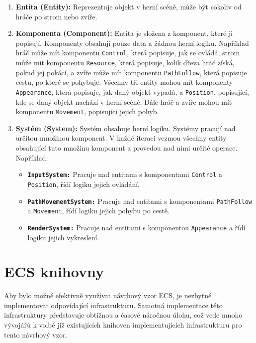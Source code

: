 \begin{enumerate}
    \item \textbf{Entita (Entity):} Reprezentuje objekt v herní scéně, může být cokoliv od hráče po strom nebo zvíře.
    \item \textbf{Komponenta (Component):} Entita je složena z komponent, které ji popisují. Komponenty obsahují pouze data a žádnou herní logiku. Například hráč může mít komponentu \verb|Control|, která popisuje, jak se ovládá, strom může mít komponentu \verb|Resource|, která popisuje, kolik dřeva hráč získá, pokud jej pokácí, a zvíře může mít komponentu \verb|PathFollow|, která popisuje cestu, po které se pohybuje. Všechny tři entity mohou mít komponenty \verb|Appearance|, která popisuje, jak daný objekt vypadá, a \verb|Position|, popisující, kde se daný objekt nachází v herní scéně. Dále hráč a zvíře mohou mít komponentu \verb|Movement|, popisující jejich pohyb.
    \item \textbf{Systém (System):} Systém obsahuje herní logiku. Systémy pracují nad určitou množinou komponent. V každé iteraci vezmou všechny entity obsahující tuto množinu komponent a provedou nad nimi určité operace. Například:
    \begin{itemize}
        \item \textbf{\texttt{InputSystem:}} Pracuje nad entitami s komponentami \verb|Control| a \verb|Position|, řídí logiku jejich ovládání.
        \item \textbf{\texttt{PathMovementSystem:}} Pracuje nad entitami s komponentami \verb|PathFollow| a \verb|Movement|, řídí logiku jejich pohybu po cestě.
        \item \textbf{\texttt{RenderSystem:}} Pracuje nad entitami s komponentou \verb|Appearance| a řídí logiku jejich vykreslení.
    \end{itemize}
\end{enumerate}


\section{ECS knihovny}
\label{sec:ecs-libs}
Aby bylo možné efektivně využívat návrhový vzor ECS, je nezbytné implementovat odpovídající infrastrukturu. Samotná implementace této infrastruktury představuje obtížnou a časově náročnou úlohu, což vede mnoho vývojářů k volbě již existujících knihoven implementujících infrastrukturu pro tento návrhový vzor.

